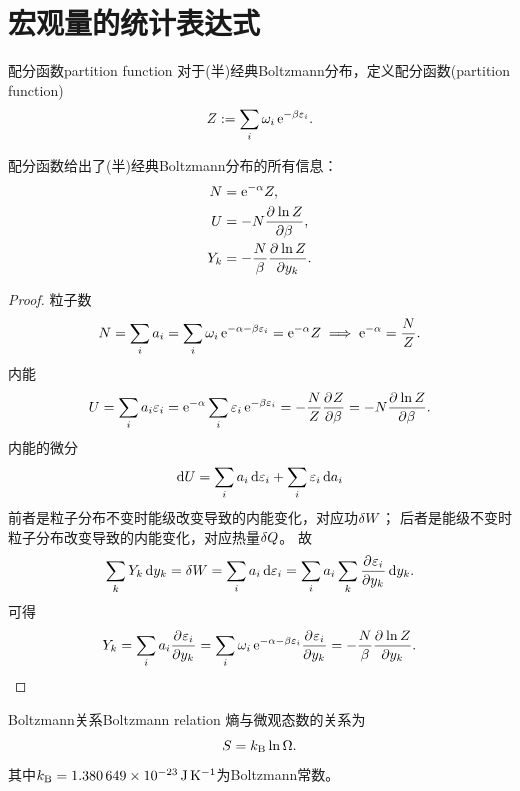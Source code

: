 \section{宏观量的统计表达式}

\begin{definition}{配分函数}{partition function}
	对于(半)经典Boltzmann分布，定义配分函数(partition function)
	\begin{equation}
		Z:=\sum_i\omega_i\mathop{}\!\mathrm{e}^{-\beta\varepsilon_i}.
	\end{equation}
\end{definition}

\begin{corollary}
	配分函数给出了(半)经典Boltzmann分布的所有信息：
	\begin{subequations}
		\begin{align}
			N&=\mathop{}\!\mathrm{e}^{-\alpha}Z,\\
			\label{eq:U=-NplnZ}
			U&=-N\frac{\partial^{{}}\ln Z}{\partial{\beta}^{{}}},\\
			\label{eq:Y=-NplnZ/beta}
			Y_k&=-\frac N\beta\frac{\partial^{{}}\ln Z}{\partial{y_k}^{{}}}.
		\end{align}
	\end{subequations}
\end{corollary}

\begin{proof}
	粒子数
	\[
		N=\sum_i a_i=\sum_i \omega_i\mathop{}\!\mathrm{e}^{-\alpha-\beta\varepsilon_i}=\mathop{}\!\mathrm{e}^{-\alpha}Z
		\implies\mathop{}\!\mathrm{e}^{-\alpha}=\frac NZ.
	\]
	内能
	\[
		U=\sum_i a_i\varepsilon_i=\mathop{}\!\mathrm{e}^{-\alpha}\sum_i \varepsilon_i\mathop{}\!\mathrm{e}^{-\beta\varepsilon_i}=-\frac NZ\frac{\partial^{{}}Z}{\partial{\beta}^{{}}}=-N\frac{\partial^{{}}\ln Z}{\partial{\beta}^{{}}}.
	\]
	内能的微分
	\[
		\mathop{}\!\mathrm{d} U=\sum_i a_i\mathop{}\!\mathrm{d}\varepsilon_i+\sum_i \varepsilon_i\mathop{}\!\mathrm{d} a_i
	\]
	前者是粒子分布不变时能级改变导致的内能变化，对应功$\mathop{}\!\delta W$；
	后者是能级不变时粒子分布改变导致的内能变化，对应热量$\mathop{}\!\delta Q$。
	故
	\[
		\sum_k Y_k\mathop{}\!\mathrm{d} y_k=\mathop{}\!\delta W=\sum_i a_i\mathop{}\!\mathrm{d}\varepsilon_i=\sum_i a_i\sum_k\frac{\partial^{{}}\varepsilon_i}{\partial{y_k}^{{}}}\mathop{}\!\mathrm{d} y_k.
	\]
	可得
	\[
		Y_k=\sum_i a_i\frac{\partial^{{}}\varepsilon_i}{\partial{y_k}^{{}}}=\sum_i \omega_i\mathop{}\!\mathrm{e}^{-\alpha-\beta\varepsilon_i}\frac{\partial^{{}}\varepsilon_i}{\partial{y_k}^{{}}}=-\frac N\beta\frac{\partial^{{}}\ln Z}{\partial{y_k}^{{}}}.
		\qedhere
	\]
\end{proof}

\begin{theorem}{Boltzmann关系}{Boltzmann relation}
	熵与微观态数的关系为
	\begin{equation}
		S=k_{\mathrm B}\ln\Omega.
	\end{equation}
	其中$\kB=\SI{1.380649e-23}{\J\per\K}$为Boltzmann常数。
\end{theorem}

